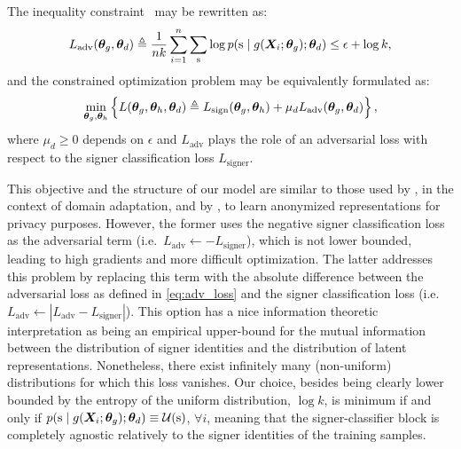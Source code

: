 The inequality constraint~ may be rewritten as:
\begin{equation}
    \label{eq:adv_loss}
    L_{\text{adv}}({\bm{\theta}}_g, {\bm{\theta}}_d) \triangleq \frac{1}{nk}\sum_{i=1}^n \sum_{{\textnormal{s}}} \log p({\textnormal{s}} \mid g({\bm{X}}_{i}; {\bm{\theta}}_g); {\bm{\theta}}_d) \leq \epsilon + \log k,
\end{equation}
and the constrained optimization problem may be equivalently formulated as:
\begin{equation}
    \label{eq:tr_obj}
    \min_{{\bm{\theta}}_g, {\bm{\theta}}_h}  \left\lbrace L({\bm{\theta}}_g, {\bm{\theta}}_h, {\bm{\theta}}_d) \triangleq L_{\text{sign}}({\bm{\theta}}_g, {\bm{\theta}}_h) + \mu_d L_{\text{adv}}({\bm{\theta}}_g, {\bm{\theta}}_d) \right\rbrace,
\end{equation}
where $\mu_d \geq 0$ depends on $\epsilon$ and $L_{\text{adv}}$ plays the role of an adversarial loss with respect to the signer classification loss $L_{\text{signer}}$.

This objective and the structure of our model are similar to those used by \citet{Ganin2015}, in the context of domain adaptation, and by \citet{Feutry2018}, to learn anonymized representations for privacy purposes. However, the former uses the negative signer classification loss as the adversarial term (i.e.\ $L_{\text{adv}} \leftarrow -L_{\text{signer}}$), which is not lower bounded, leading to high gradients and more difficult optimization. The latter addresses this problem by replacing this term with the absolute difference between the adversarial loss as defined in \eqref{eq:adv_loss} and the signer classification loss (i.e.\ $L_{\text{adv}} \leftarrow |L_{\text{adv}} - L_{\text{signer}}|$). This option has a nice information theoretic interpretation as being an empirical upper-bound for the mutual information between the distribution of signer identities and the distribution of latent representations. Nonetheless, there exist infinitely many (non-uniform) distributions for which this loss vanishes. Our choice, besides being clearly lower bounded by the entropy of the uniform distribution, $\log k$, is minimum if and only if $p({\textnormal{s}} \mid g({\bm{X}}_{i}; {\bm{\theta}}_g); {\bm{\theta}}_d) \equiv {\mathcal{U}}({\textnormal{s}})$, $\forall i$, meaning that the signer-classifier block is completely agnostic relatively to the signer identities of the training samples.

